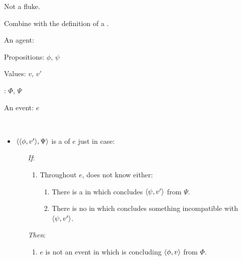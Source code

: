 \begin{note}
  \color{red}
  Not a fluke.
\end{note}


\begin{note}
  Combine with the definition of a \fc{}.

  \begin{proposition}
    \label{prop:requ-fc}
    \begin{itemize*}[noitemsep, label=\(\circ\)]
    \item
      An agent: \vAgent{}
    \item
      Propositions: \(\phi\), \(\psi\)
    \item
      Values: \(v\), \(v'\)
    \item
      : \(\Phi\), \(\Psi\)
    \item
      An event: \(e\)
    \item
      \mbox{ }
    \end{itemize*}

    \begin{itemize}
    \item
      \(\langle \langle \phi, v' \rangle, \Psi \rangle\) is a \emph{\requ{}} of \(e\) just in case:
      \begin{itemize}
      \item[\emph{If}:]
        \begin{enumerate}[label=\alph*., ref=(\alph*), series=requDefSeries]
        \item
          \label{prop:requ-fc:nk}
          Throughout \(e\), \vAgent{} does not know either:
          \begin{enumerate}[label=\roman*., ref=(\roman*)]
          \item
            \label{prop:requ-fc:nk:psi}
            There is a \pevent{} in which \vAgent{} concludes \(\langle \psi, v' \rangle\) from \(\Psi\).
          \item
            \label{prop:requ-fc:nk:no-conf}
            There is no \pevent{} in which \vAgent{} concludes something incompatible with \(\langle \psi, v' \rangle\).
          \end{enumerate}
        \end{enumerate}
      \item[\emph{Then}:]
        \begin{enumerate}[label=\alph*., ref=(\alph*), resume*=requDefSeries]
        \item
          \label{prop:requ-fc:ne}
          \(e\) is not an event in which \vAgent{} is concluding \(\langle \phi, v \rangle\) from \(\Phi\).
        \end{enumerate}
      \end{itemize}
    \end{itemize}
    \vspace{-\baselineskip}
  \end{proposition}


\end{note}
